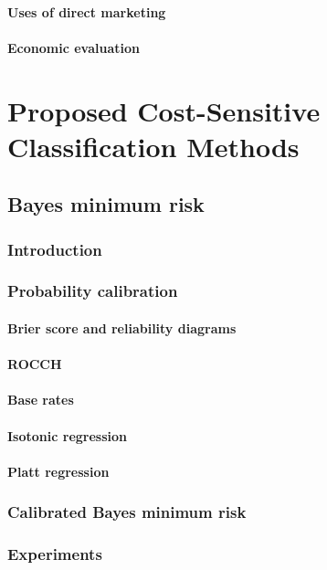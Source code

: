 \documentclass[twoside,openright,titlepage,numbers=noenddot,headinclude,%
               footinclude=true,cleardoublepage=empty,abstractoff,BCOR=5mm,%
               paper=a4,fontsize=11pt,ngerman,american]{scrreprt}
\numberwithin{theorem}{chapter}
\numberwithin{definition}{chapter}
\numberwithin{algorithm}{chapter}
\numberwithin{figure}{chapter}
\numberwithin{table}{chapter}
\numberwithin{equation}{chapter}
\begin{document}
			\subsection{Uses of direct marketing}
			\subsection{Economic evaluation}

\part{Proposed Cost-Sensitive Classification Methods}

	\chapter{Bayes minimum risk}
		\section{Introduction}
		\section{Probability calibration}
			\subsection{Brier score and reliability diagrams}
			\subsection{ROCCH}
			\subsection{Base rates}
			\subsection{Isotonic regression}
			\subsection{Platt regression}
		\section{Calibrated Bayes minimum risk}
		\section{Experiments}
		
\end{document}
